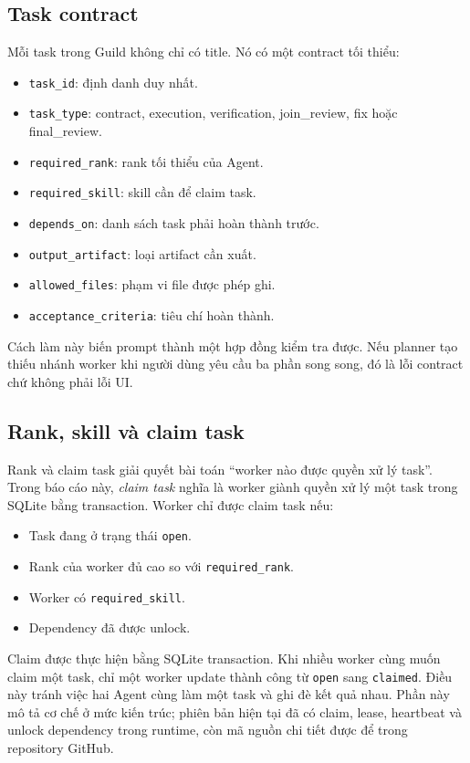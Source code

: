 \documentclass[12pt,a4paper]{article}
\begin{document}
\subsection{Task contract}

Mỗi task trong Guild không chỉ có title. Nó có một contract tối thiểu:

\begin{itemize}
    \item \texttt{task\_id}: định danh duy nhất.
    \item \texttt{task\_type}: contract, execution, verification, join\_review, fix hoặc final\_review.
    \item \texttt{required\_rank}: rank tối thiểu của Agent.
    \item \texttt{required\_skill}: skill cần để claim task.
    \item \texttt{depends\_on}: danh sách task phải hoàn thành trước.
    \item \texttt{output\_artifact}: loại artifact cần xuất.
    \item \texttt{allowed\_files}: phạm vi file được phép ghi.
    \item \texttt{acceptance\_criteria}: tiêu chí hoàn thành.
\end{itemize}

Cách làm này biến prompt thành một hợp đồng kiểm tra được. Nếu planner tạo thiếu nhánh worker khi người dùng yêu cầu ba phần song song, đó là lỗi contract chứ không phải lỗi UI.

\subsection{Rank, skill và claim task}

Rank và claim task giải quyết bài toán ``worker nào được quyền xử lý task''. Trong báo cáo này, \textit{claim task} nghĩa là worker giành quyền xử lý một task trong SQLite bằng transaction. Worker chỉ được claim task nếu:

\begin{itemize}
    \item Task đang ở trạng thái \texttt{open}.
    \item Rank của worker đủ cao so với \texttt{required\_rank}.
    \item Worker có \texttt{required\_skill}.
    \item Dependency đã được unlock.
\end{itemize}

Claim được thực hiện bằng SQLite transaction. Khi nhiều worker cùng muốn claim một task, chỉ một worker update thành công từ \texttt{open} sang \texttt{claimed}. Điều này tránh việc hai Agent cùng làm một task và ghi đè kết quả nhau. Phần này mô tả cơ chế ở mức kiến trúc; phiên bản hiện tại đã có claim, lease, heartbeat và unlock dependency trong runtime, còn mã nguồn chi tiết được để trong repository GitHub.
\end{document}
